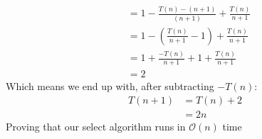 \documentclass{report}
\begin{document}
{\begin{align*}
        &= 1 - \frac{T(n) - (n + 1)}{\left(n+1\right)} + \displaystyle\frac{T(n)}{n+1} \\
        &= 1 - \left(\displaystyle\frac{T(n)}{n+1} - 1\right) + \displaystyle\frac{T(n)}{n+1} \\
        &= 1 + \displaystyle\frac{-T(n)}{n+1} + 1 + \displaystyle\frac{T(n)}{n+1} \\
        &= 2
    \end{align*}
    Which means we end up with, after subtracting \(-T(n)\):
    \begin{align*}
        T(n + 1) &= T(n) + 2 \\
        &= 2n
    \end{align*}
    Proving that our select algorithm runs in \(\mathcal{O}(n)\) time
    
}
\end{document}
